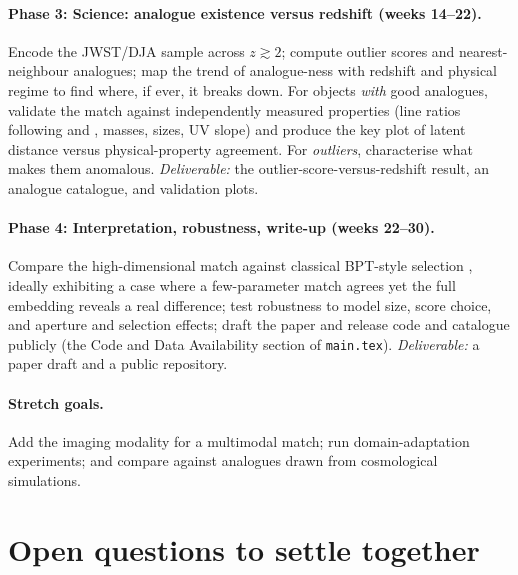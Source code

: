 \documentclass[onecolumn,astrosymb,tighten,longbib,trackchanges]{aastex7} %
\begin{document}
\paragraph{Phase 3: Science: analogue existence versus redshift (weeks 14--22).} Encode the
JWST/DJA sample across $z\gtrsim2$; compute outlier scores and nearest-neighbour analogues; map the
trend of analogue-ness with redshift and physical regime to find where, if ever, it breaks down. For
objects \emph{with} good analogues, validate the match against independently measured properties
(line ratios following \citealt{Bian2016_local_analogues} and \citealt{Hayes2025_highz_UV}, masses,
sizes, UV slope) and produce the key plot of latent distance versus physical-property agreement. For
\emph{outliers}, characterise what makes them anomalous. \emph{Deliverable:} the
outlier-score-versus-redshift result, an analogue catalogue, and validation plots.

\paragraph{Phase 4: Interpretation, robustness, write-up (weeks 22--30).} Compare the
high-dimensional match against classical BPT-style selection \citep{Bian2016_local_analogues},
ideally exhibiting a case where a few-parameter match agrees yet the full embedding reveals a real
difference; test robustness to model size, score choice, and aperture and selection effects; draft
the paper and release code and catalogue publicly (the Code and Data Availability section of
\texttt{main.tex}). \emph{Deliverable:} a paper draft and a public repository.

\paragraph{Stretch goals.} Add the imaging modality for a multimodal match; run domain-adaptation
experiments; and compare against analogues drawn from cosmological simulations.


\section{Open questions to settle together} \label{sec:open}
\end{document}
